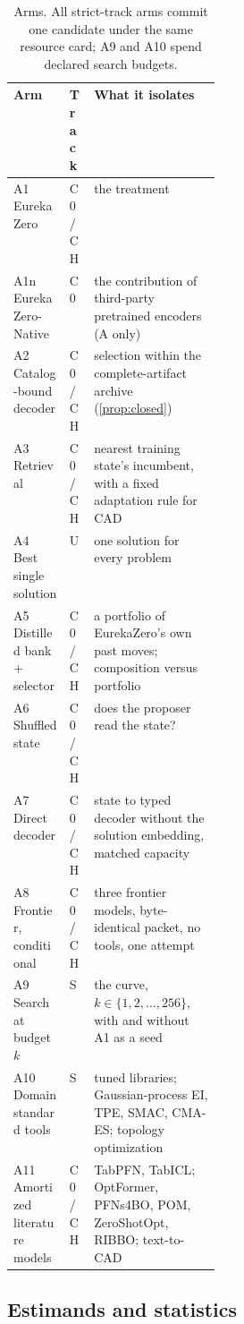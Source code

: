 \begin{table}[t]
\caption{Arms. All strict-track arms commit one candidate under the same resource card; A9 and A10
spend declared search budgets.}
\label{tab:arms}
\centering\tablesf
\begin{tabularx}{\linewidth}{@{}>{\raggedright\arraybackslash}p{0.27\linewidth}lL@{}}
\toprule
Arm & Track & What it isolates \\
\midrule
A1 EurekaZero & C0/CH & the treatment \\
A1n EurekaZero-Native & C0 & the contribution of third-party pretrained encoders (A only) \\
A2 Catalog-bound decoder & C0/CH & selection within the complete-artifact archive (\cref{prop:closed}) \\
A3 Retrieval & C0/CH & nearest training state's incumbent, with a fixed adaptation rule for CAD \\
A4 Best single solution & U & one solution for every problem \\
A5 Distilled bank + selector & C0/CH & a portfolio of EurekaZero's own past moves; composition versus portfolio \\
A6 Shuffled state & C0/CH & does the proposer read the state? \\
A7 Direct decoder & C0/CH & state to typed decoder without the solution embedding, matched capacity \\
A8 Frontier, conditional & C0/CH & three frontier models, byte-identical packet, no tools, one attempt \\
A9 Search at budget $k$ & S & the curve, $k\in\{1,2,\ldots,256\}$, with and without A1 as a seed \\
A10 Domain standard tools & S & tuned libraries; Gaussian-process EI, TPE, SMAC, CMA-ES; topology optimization \\
A11 Amortized literature models & C0/CH & TabPFN, TabICL; OptFormer, PFNs4BO, POM, ZeroShotOpt, RIBBO; text-to-CAD \\
\bottomrule
\end{tabularx}
\end{table}

\subsection{Estimands and statistics}

